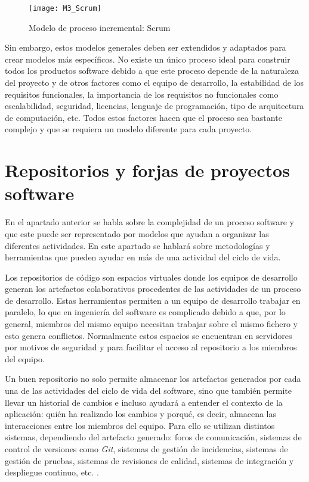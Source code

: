 \begin{figure}[!h]
	\centering
	\texttt{[image: M3\_Scrum]}
	\caption{Modelo de proceso incremental: Scrum \cite{scrum_master_scrum_2019}}
	\label{fig:M3_Scrum}
\end{figure}
\FloatBarrier

Sin embargo, estos modelos generales deben ser extendidos y adaptados para crear modelos más específicos. No existe un único proceso ideal para construir todos los productos software debido a que este proceso depende de la naturaleza del proyecto y de otros factores como el equipo de desarrollo, la estabilidad de los requisitos funcionales, la importancia de los requisitos no funcionales como escalabilidad, seguridad, licencias, lenguaje de programación, tipo de arquitectura de computación, etc. Todos estos factores hacen que el proceso sea bastante complejo y que se requiera un modelo diferente para cada proyecto.


\section{Repositorios y forjas de proyectos software}


En el apartado anterior se habla sobre la complejidad de un proceso software y que este puede ser representado por modelos que ayudan a organizar las diferentes actividades. En este apartado se hablará sobre metodologías y herramientas que pueden ayudar en más de una actividad del ciclo de vida.

Los repositorios de código son espacios virtuales donde los equipos de desarrollo generan los artefactos colaborativos procedentes de las actividades de un proceso de desarrollo. Estas herramientas permiten a un equipo de desarrollo trabajar en paralelo, lo que en ingeniería del software es complicado debido a que, por lo general, miembros del mismo equipo necesitan trabajar sobre el mismo fichero y esto genera conflictos. Normalmente estos espacios se encuentran en servidores por motivos de seguridad y para facilitar el acceso al repositorio a los miembros del equipo.

Un buen repositorio no solo permite almacenar los artefactos generados por cada una de las actividades del ciclo de vida del software, sino que también permite llevar un historial de cambios e incluso ayudará a entender el contexto de la aplicación: quién ha realizado los cambios y porqué, es decir, almacena las interacciones entre los miembros del equipo. Para ello se utilizan distintos sistemas, dependiendo del artefacto generado: foros de comunicación, sistemas de control de versiones como \textit{Git}, sistemas de gestión de incidencias, sistemas de gestión de pruebas, sistemas de revisiones de calidad, sistemas de integración y despliegue continuo, etc. \cite{guemes-pena_emerging_2018}.

